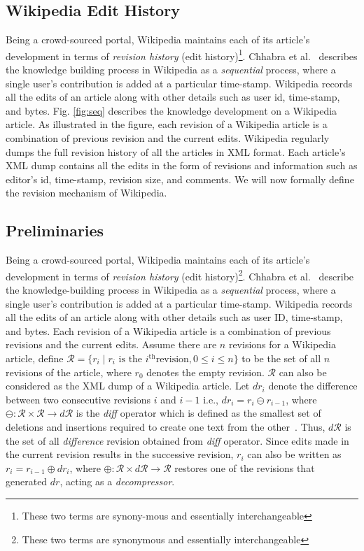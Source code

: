 \documentclass[acmsmall]{acmart}
\begin{document}
\subsection{Wikipedia Edit History}
Being a crowd-sourced portal, Wikipedia maintains each of its article's development in terms of \emph{revision history} (edit history)\footnote{These two terms are synony-mous and essentially interchangeable}. Chhabra et al.~\cite{chhabra2017does} describes the knowledge building process in Wikipedia as a \emph{sequential} process, where a single user's contribution is added at a particular time-stamp. Wikipedia records all the edits of an article along with other details such as user id, time-stamp, and bytes. Fig. \ref{fig:seq} describes the knowledge development on a Wikipedia article. As illustrated in the figure, each revision of a Wikipedia article is a combination of previous revision and the current edits. Wikipedia regularly dumps the full revision history of all the articles in XML format. Each article's XML dump contains all the edits in the form of revisions and information such as editor's id, time-stamp, revision size, and comments. We will now formally define the revision mechanism of Wikipedia.
         

\subsection{Preliminaries}\label{pre}
Being a crowd-sourced portal, Wikipedia maintains each of its article's development in terms of \emph{revision history} (edit history)\footnote{These two terms are synonymous and essentially interchangeable}. Chhabra et al.~\cite{chhabra2017does} describe the knowledge-building process in Wikipedia as a \emph{sequential} process, where a single user's contribution is added at a particular time-stamp. Wikipedia records all the edits of an article along with other details such as user ID, time-stamp, and bytes. Each revision of a Wikipedia article is a combination of previous revisions and the current edits.
Assume there are $n$ revisions for a Wikipedia article, define $\mathcal{R} =\{r_i \mid r_i \text{ is the } i^{\text{th}} \text{revision}, 0 \leq i \leq n\}$ to be the set of all $n$ revisions of the article, where $r_0$ denotes the empty revision. $\mathcal{R}$ can also be considered as the XML dump of a Wikipedia article.
Let $dr_{i}$ denote the difference between two consecutive revisions $i$ and $i-1$ i.e., $dr_i = r_{i} \ominus r_{i-1}$, where $\ominus : \mathcal{R}\times\mathcal{R}\rightarrow d\mathcal{R}$ is the \emph{diff} operator which is defined as the smallest set of deletions and insertions required to create one text from the other~\cite{hunt1976algorithm}. Thus, $d\mathcal{R}$ is the set of all \emph{difference} revision obtained from \emph{diff} operator. Since edits made in the current revision results in the successive revision, $r_{i}$ can also be written as $r_{i} = r_{i-1} \oplus dr_{i}$, where $\oplus : \mathcal{R} \times d\mathcal{R} \rightarrow \mathcal{R}$ restores one of the revisions that generated $dr$, acting as a \emph{decompressor}.
\end{document}
